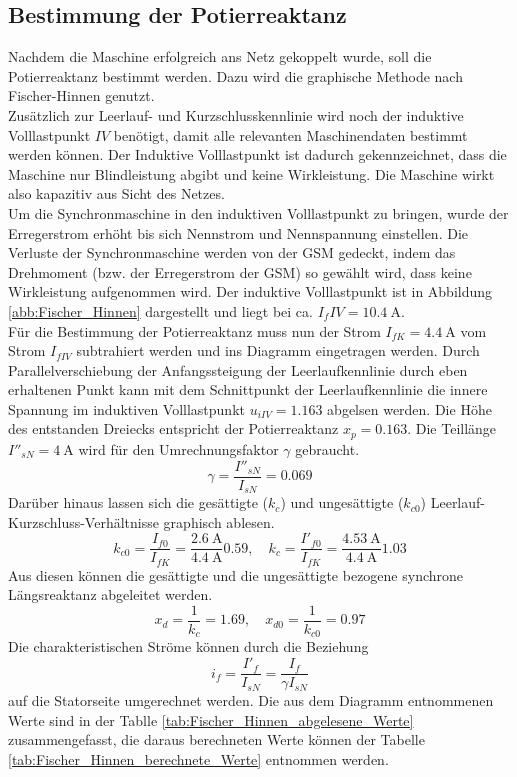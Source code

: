 \subsection{Bestimmung der Potierreaktanz}
\label{subsec:potierreaktanz}
Nachdem die Maschine erfolgreich ans Netz gekoppelt wurde, soll die Potierreaktanz bestimmt werden. Dazu wird die graphische Methode nach Fischer-Hinnen genutzt.\\
Zusätzlich zur Leerlauf- und Kurzschlusskennlinie wird noch der induktive Volllastpunkt $IV$ benötigt, damit alle relevanten Maschinendaten bestimmt werden können. Der Induktive Volllastpunkt ist dadurch gekennzeichnet, dass die Maschine nur Blindleistung abgibt und keine Wirkleistung. Die Maschine wirkt also kapazitiv aus Sicht des Netzes.\\
Um die Synchronmaschine in den induktiven Volllastpunkt zu bringen, wurde der Erregerstrom erhöht bis sich Nennstrom und Nennspannung einstellen. Die Verluste der Synchronmaschine werden von der GSM gedeckt, indem das Drehmoment (bzw. der Erregerstrom der GSM) so gewählt wird, dass keine Wirkleistung aufgenommen wird. Der induktive Volllastpunkt ist in Abbildung \ref{abb:Fischer_Hinnen} dargestellt und liegt bei ca. $I_fIV = \SI{10.4}{\ampere}$.\\
Für die Bestimmung der Potierreaktanz muss nun der Strom $I_{fK}= \SI{4.4}{\ampere}$ vom Strom $I_{fIV}$ subtrahiert werden und ins Diagramm eingetragen werden. Durch Parallelverschiebung der Anfangssteigung der Leerlaufkennlinie durch eben erhaltenen Punkt kann mit dem Schnittpunkt der Leerlaufkennlinie die innere Spannung im induktiven Volllastpunkt $u_{iIV} = 1.163$ abgelsen werden. Die Höhe des entstanden Dreiecks entspricht der Potierreaktanz $x_p = 0.163$. Die Teillänge $I''_{sN}= \SI{4}{\ampere}$ wird für den Umrechnungsfaktor $\gamma$ gebraucht.
\begin{equation*}
    \gamma = \frac{I''_{sN}}{I_{sN}} = 0.069
\end{equation*}
Darüber hinaus lassen sich die gesättigte ($k_ {c}$) und ungesättigte ($k_ {c0}$) Leerlauf-Kurzschluss-Verhältnisse graphisch ablesen.
\begin{equation*}
    k_ {c0} = \frac{I_{f0}}{I_{fK}} = \frac{\SI{2.6}{\ampere}}{\SI{4.4}{\ampere}} 0.59, \quad k_ {c} = \frac{I'_{f0}}{I_{fK}} = \frac{\SI{4.53}{\ampere}}{\SI{4.4}{\ampere}} 1.03
\end{equation*}
Aus diesen können die gesättigte und die ungesättigte bezogene synchrone Längsreaktanz abgeleitet werden.
\begin{equation*}
    x_d = \frac{1}{k_c} = 1.69, \quad x_{d0} = \frac{1}{k_{c0}} = 0.97
\end{equation*}
Die charakteristischen Ströme können durch die Beziehung
\begin{equation*}
    i_f = \frac{I'_f}{I_{sN}} = \frac{I_f}{\gamma I_{sN}}
\end{equation*}
auf die Statorseite umgerechnet werden. Die aus dem Diagramm entnommenen Werte sind in der Tablle \ref{tab:Fischer_Hinnen_abgelesene_Werte} zusammengefasst, die daraus berechneten Werte können der Tabelle \ref{tab:Fischer_Hinnen_berechnete_Werte} entnommen werden.

